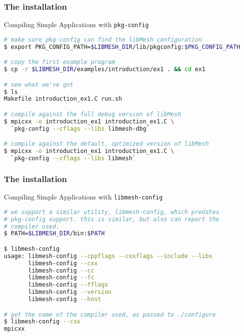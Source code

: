 \begin{frame}
  \frametitle{The \libMesh{} installation}

  \begin{block}{Compiling Simple Applications with \texttt{pkg-config}}
    \begin{lstlisting}[language=bash]
# make sure pkg-config can find the libMesh configuration
$ export PKG_CONFIG_PATH=$LIBMESH_DIR/lib/pkgconfig:$PKG_CONFIG_PATH

# copy the first example program
$ cp -r $LIBMESH_DIR/examples/introduction/ex1 . && cd ex1

# see what we've got
$ ls
Makefile introduction_ex1.C run.sh

# compile against the full debug version of libMesh
$ mpicxx -o introduction_ex1 introduction_ex1.C \
  `pkg-config --cflags --libs libmesh-dbg`

# compile against the default, optimized version of libMesh
$ mpicxx -o introduction_ex1 introduction_ex1.C \
  `pkg-config --cflags --libs libmesh`
    \end{lstlisting}
  \end{block}
\end{frame}






\begin{frame}[fragile,shrink]
  \frametitle{The \libMesh{} installation}

  \begin{block}{Compiling Simple Applications with \texttt{libmesh-config}}
    \begin{lstlisting}[language=bash]
# we support a similar utility, libmesh-config, which predates
# pkg-config support. this is similar, but also can report the
# compiler used.
$ PATH=$LIBMESH_DIR/bin:$PATH

$ libmesh-config
usage: libmesh-config --cppflags --cxxflags --include --libs
       libmesh-config --cxx
       libmesh-config --cc
       libmesh-config --fc
       libmesh-config --fflags
       libmesh-config --version
       libmesh-config --host

# get the name of the compiler used, as passed to ./configure
$ libmesh-config --cxx
mpicxx
    \end{lstlisting}
  \end{block}
\end{frame}



